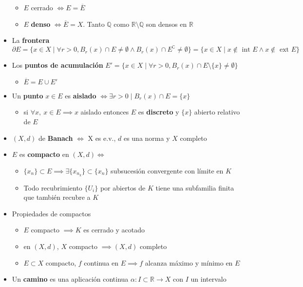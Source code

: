 \documentclass[a4paper,twocolumn]{extarticle}
\newcommand{\R}{\mathbb{R}}
\newcommand{\Int}{\text{ int }}
\newcommand{\Ext}{\text{ ext }}
\begin{document}
\begin{itemize}
	\begin{itemize}
		\item $E$ cerrado $\iff E = \overline{E}$
		\item $E$ \textbf{denso} $\iff \overline{E} = X$. Tanto $\mathbb{Q}$ como $\R \setminus \mathbb{Q}$ son densos en $\R$
	\end{itemize}
	\item La \textbf{frontera} $\partial E = \{x \in X \mid \forall r > 0, B_r(x) \cap E \neq \emptyset \land B_r(x) \cap E^\complement \neq \emptyset\} = \{x \in X \mid x \not\in \Int E \land x \not\in \Ext E\}$
	\item Los \textbf{puntos de acumulación} $E' = \{x \in X \mid \forall r > 0, B_r(x) \cap E \setminus\{x\} \neq \emptyset \}$
	\begin{itemize}
		\item $\overline{E} = E \cup E'$
	\end{itemize}
	\item Un \textbf{punto} $x \in E$ es \textbf{aislado} $\iff \exists r > 0 \mid B_r(x) \cap E = \{x\}$
	\begin{itemize}
		\item  si $\forall x,\ x \in E \implies x$ aislado entonces $E$ es \textbf{discreto} y $\{x\}$ abierto relativo de $E$
	\end{itemize}
	\item $(X,d)$ de \textbf{Banach} $\iff$ X es e.v., $d$ es una norma y $X$ completo
	\item $E$ es \textbf{compacto} en $(X,d) \iff$
	\begin{itemize}
		\item $\{x_n\} \subset E \implies \exists \{x_{n_k}\} \subset \{x_n\}$ subsucesión convergente con límite en $K$
		\item Todo recubrimiento $\{U_i\}$ por abiertos de $K$ tiene una subfamilia finita que también recubre a $K$
	\end{itemize}
	\item Propiedades de compactos
	\begin{itemize}
		\item $E$ compacto $\implies K$ es cerrado y acotado
		\item en $(X,d)$, $X$ compacto $\implies (X,d)$ completo
		\item $E \subset X$ compacto, $f$ continua en $E \implies f$ alcanza máximo y mínimo en $E$
	\end{itemize}
	\item Un \textbf{camino} es una aplicación continua $\alpha:I \subset \R \to X$ con $I$ un intervalo

\end{itemize}
\end{document}
